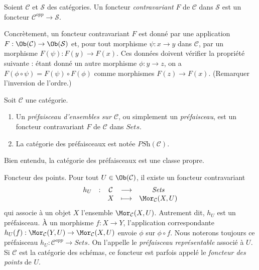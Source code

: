 \begin{definition}
\label{definition-contravariant}
Soient $\mathcal{C}$ et $\mathcal{S}$ des catégories.
Un foncteur {\it contravariant} $F$
de $\mathcal{C}$ dans $\mathcal{S}$
est un foncteur $\mathcal{C}^{opp}\to \mathcal{S}$.
\end{definition}

\noindent
Concrètement, un foncteur contravariant $F$ est donné
par une application $F : \Ob(\mathcal{C}) \to
\Ob(\mathcal{S})$ et, pour tout morphisme
$\psi : x \to y$ dans $\mathcal{C}$, par un morphisme
$F(\psi) : F(y) \to F(x)$. Ces données doivent vérifier la propriété
suivante : étant donné un autre morphisme
$\phi : y \to z$, on a $F(\phi \circ \psi)
= F(\psi) \circ F(\phi)$ comme morphismes $F(z) \to F(x)$.
(Remarquer l'inversion de l'ordre.)

\begin{definition}
\label{definition-presheaf}
Soit $\mathcal{C}$ une catégorie.
\begin{enumerate}
\item Un {\it préfaisceau d'ensembles sur $\mathcal{C}$},
ou simplement un {\it préfaisceau}, est un foncteur contravariant
$F$ de $\mathcal{C}$ dans $\textit{Sets}$.
\item La catégorie des préfaisceaux est notée $\textit{PSh}(\mathcal{C})$.
\end{enumerate}
\end{definition}

\noindent
Bien entendu, la catégorie des préfaisceaux est une classe propre.

\begin{example}
\label{example-hom-functor}
Foncteur des points.
Pour tout $U\in \Ob(\mathcal{C})$, il existe un foncteur contravariant
$$
\begin{matrix}
h_U & : & \mathcal{C}
&
\longrightarrow
&
\textit{Sets} \\
& &
X
&
\longmapsto
&
\Mor_\mathcal{C}(X, U)
\end{matrix}
$$
qui associe à un objet $X$ l'ensemble
$\Mor_\mathcal{C}(X, U)$. Autrement dit, $h_U$ est un préfaisceau.
À un morphisme $f : X\to Y$, l'application correspondante
$h_U(f) : \Mor_\mathcal{C}(Y, U)\to \Mor_\mathcal{C}(X, U)$
envoie $\phi$ sur $\phi\circ f$. Nous noterons toujours ce préfaisceau
$h_U : \mathcal{C}^{opp} \to \textit{Sets}$.
On l'appelle le {\it préfaisceau représentable} associé à $U$.
Si $\mathcal{C}$ est la catégorie des schémas, ce foncteur est
parfois appelé le \emph{foncteur des points} de $U$.
\end{example}

